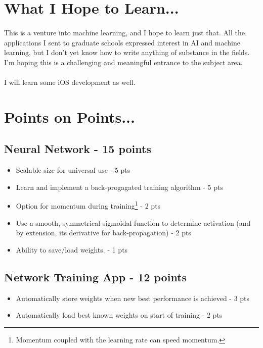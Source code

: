 \documentclass{article}
\begin{document}
\section{What I Hope to Learn...}
	\paragraph{}This is a venture into machine learning, and I hope to learn just that. All the 
	applications I sent to graduate schools expressed interest in AI and machine learning, but 
	I don’t yet know how to write anything of substance in the fields. I’m hoping this is a 
	challenging and meaningful entrance to the subject area.

	\paragraph{}I will learn some iOS development as well.

\section{Points on Points...}
	\subsection{Neural Network - 15 points}
		\begin{itemize}
			\item Scalable size for universal use - 5 pts
			\item Learn and implement a back-progagated training algorithm - 5 pts
			\item Option for momentum during training\footnote{Momentum coupled with the
					learning rate can speed momentum.} - 2 pts
			\item Use a smooth, symmetrical sigmoidal function to determine activation 
					(and by extension, its derivative for back-propagation) - 2 pts
			\item Ability to save/load weights. - 1 pts
		\end{itemize}
	\subsection{Network Training App - 12 points}
		\begin{itemize}
			\item Automatically store weights when new best performance is achieved - 3 pts
			\item Automatically load best known weights on start of training - 2 pts
		\end{itemize}
\end{document}
